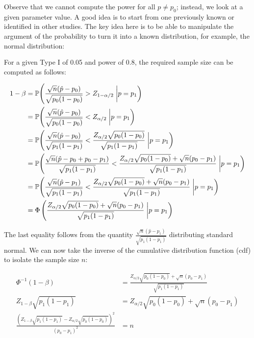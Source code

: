 \documentclass[
]{book}
\begin{document}
Observe that we cannot compute the power for all \(p\neq p_0\); instead, we look at a given parameter value. A good idea is to start from one previously known or identified in other studies. The key idea here is to be able to manipulate the argument of the probability to turn it into a known distribution, for example, the normal distribution:

For a given Type I of 0.05 and power of 0.8, the required sample size can be computed as follows:

\begin{align*}
1 - \beta & = \mathbb{P}{\left(\frac{\sqrt{n}(\hat p - p_0)}{\sqrt{p_0(1-p_0)}} > Z_{1-\alpha/2}\right.\left|\vphantom{\frac{1}{2}}p = p_1\right)} \\
& = \mathbb{P}{\left(\frac{\sqrt{n}(\hat p - p_0)}{\sqrt{p_0(1-p_0)}} < Z_{\alpha/2}\right.\left|\vphantom{\frac{1}{2}}p = p_1\right)} \\
& = \mathbb{P}{\left(\frac{\sqrt{n}(\hat p - p_0)}{\sqrt{p_1(1-p_1)}} < \frac{Z_{\alpha/2}\sqrt{p_0(1-p_0)}}{\sqrt{p_1(1-p_1)}}\right.\left|\vphantom{\frac{1}{2}}p = p_1\right)} \\
& = \mathbb{P}{\left(\frac{\sqrt{n}(\hat p - p_0 + p_0 - p_1)}{\sqrt{p_1(1-p_1)}} < \frac{Z_{\alpha/2}\sqrt{p_0(1-p_0)} + \sqrt{n}(p_0 - p_1)}{\sqrt{p_1(1-p_1)}}\right.\left|\vphantom{\frac{1}{2}}p = p_1\right)} \\
& = \mathbb{P}{\left(\frac{\sqrt{n}(\hat p - p_1)}{\sqrt{p_1(1-p_1)}} < \frac{Z_{\alpha/2}\sqrt{p_0(1-p_0)} + \sqrt{n}(p_0 - p_1)}{\sqrt{p_1(1-p_1)}}\right.\left|\vphantom{\frac{1}{2}}p = p_1\right)} \\
& = \Phi\left(\frac{Z_{\alpha/2}\sqrt{p_0(1-p_0)} + \sqrt{n}(p_0 - p_1)}{\sqrt{p_1(1-p_1)}}\right.\left|\vphantom{\frac{1}{2}}p = p_1\right) \\
\end{align*}

The last equality follows from the quantity \(\frac{\sqrt{n}(\hat p - p_1)}{\sqrt{p_1(1-p_1)}}\) distributing standard normal. We can now take the inverse of the cumulative distribution function (cdf) to isolate the sample size \(n\):

\begin{align*}
\Phi^{-1}(1 - \beta)& = \frac{Z_{\alpha/2}\sqrt{p_0(1-p_0)} + \sqrt{n}(p_0 - p_1)}{\sqrt{p_1(1-p_1)}} \\
Z_{1-\beta}\sqrt{p_1(1-p_1)}& = Z_{\alpha/2}\sqrt{p_0(1-p_0)} + \sqrt{n}(p_0 - p_1) \\
\frac{\left(Z_{1-\beta}\sqrt{p_1(1-p_1)} - Z_{\alpha/2}\sqrt{p_0(1-p_0)}\right)^2}{(p_0 - p_1)^2}& = n \\
\end{align*}
\end{document}
